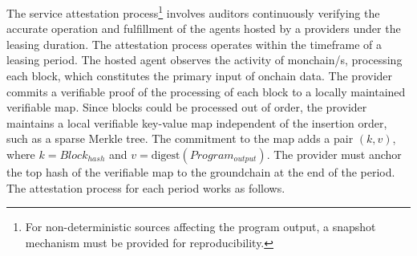 \documentclass{oc}
\begin{document}
The service attestation process\footnote{
  For non-deterministic sources affecting the program output, a snapshot mechanism must be provided for reproducibility.
} involves \glspl{auditor} continuously verifying the accurate operation and fulfillment of the agents hosted by a \glspl{provider} under the leasing duration.
The attestation process operates within the timeframe of a leasing period.
The hosted \gls{agent} observes the activity of \gls{monchain}/s, processing each block, which constitutes the primary input of onchain data.
The \gls{provider} commits a verifiable proof of the processing of each block to a locally maintained verifiable map.
Since blocks could be processed out of order, the \gls{provider} maintains a local verifiable key-value map independent of the insertion order, such as a sparse Merkle tree\cite{cryptoeprint:2016/683}.
The commitment to the map adds a pair $(k, v)$, where $k=Block_{hash}$ and $v=\text{digest}(Program_{output})$.
The \gls{provider} must anchor the top hash of the verifiable map to the \gls{groundchain} at the end of the period.
The attestation process for each period works as follows.
\end{document}
